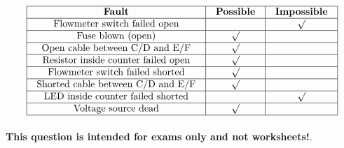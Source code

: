 






$$\vbox{\offinterlineskip
\halign{\strut
\vrule \quad\hfil # \ \hfil & 
\vrule \quad\hfil # \ \hfil & 
\vrule \quad\hfil # \ \hfil \vrule \cr
\noalign{\hrule}
%
{\bf Fault} & {\bf Possible} & {\bf Impossible} \cr
%
\noalign{\hrule}
%
Flowmeter switch failed open &  & $\surd$ \cr
%
\noalign{\hrule}
%
Fuse blown (open) & $\surd$ &  \cr
%
\noalign{\hrule}
%
Open cable between C/D and E/F & $\surd$ &  \cr
%
\noalign{\hrule}
%
Resistor inside counter failed open & $\surd$ &  \cr
%
\noalign{\hrule}
%
Flowmeter switch failed shorted & $\surd$ &  \cr
%
\noalign{\hrule}
%
Shorted cable between C/D and E/F & $\surd$ &  \cr
%
\noalign{\hrule}
%
LED inside counter failed shorted &  & $\surd$ \cr
%
\noalign{\hrule}
%
Voltage source dead & $\surd$ &  \cr
%
\noalign{\hrule}
} %
}$$ %








{\bf This question is intended for exams only and not worksheets!}.


